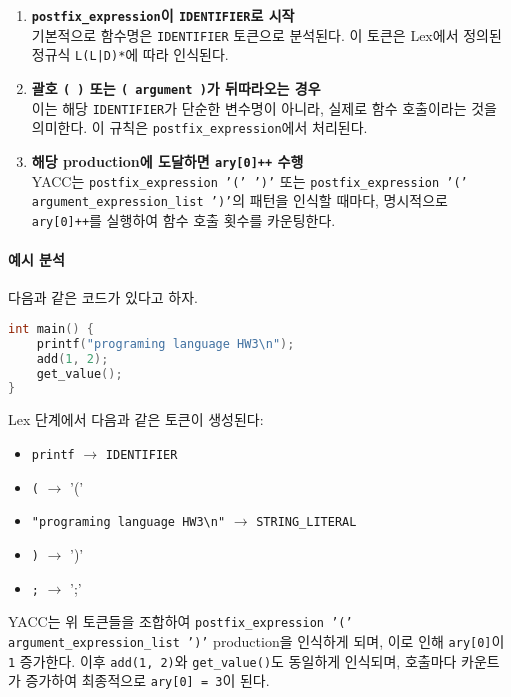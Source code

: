 \documentclass{article}
\begin{document}
\begin{enumerate}
  \item \textbf{\texttt{postfix\_expression}이 \texttt{IDENTIFIER}로 시작} \\
  기본적으로 함수명은 \texttt{IDENTIFIER} 토큰으로 분석된다. 이 토큰은 Lex에서 정의된 정규식 \texttt{{L}({L}|{D})*}에 따라 인식된다.

  \item \textbf{괄호 \texttt{( )} 또는 \texttt{( argument )}가 뒤따라오는 경우} \\
  이는 해당 \texttt{IDENTIFIER}가 단순한 변수명이 아니라, 실제로 함수 호출이라는 것을 의미한다. 이 규칙은 \texttt{postfix\_expression}에서 처리된다.

  \item \textbf{해당 production에 도달하면 \texttt{ary[0]++} 수행} \\
  YACC는 \texttt{postfix\_expression '(' ')'} 또는 \texttt{postfix\_expression '(' argument\_expression\_list ')'}의 패턴을 인식할 때마다, 명시적으로 \texttt{ary[0]++}를 실행하여 함수 호출 횟수를 카운팅한다.
\end{enumerate}


\paragraph{예시 분석}
다음과 같은 코드가 있다고 하자.

\begin{lstlisting}[language=C]
int main() {
    printf("programing language HW3\n");
    add(1, 2);
    get_value();
}
\end{lstlisting}

Lex 단계에서 다음과 같은 토큰이 생성된다:

\begin{itemize}
  \item \texttt{printf} $\rightarrow$ \texttt{IDENTIFIER}
  \item \texttt{(} $\rightarrow$ '('
  \item \texttt{"programing language HW3\textbackslash n"} $\rightarrow$ \texttt{STRING\_LITERAL}
  \item \texttt{)} $\rightarrow$ ')'
  \item \texttt{;} $\rightarrow$ ';'
\end{itemize}

YACC는 위 토큰들을 조합하여 \texttt{postfix\_expression '(' argument\_expression\_list ')'} production을 인식하게 되며, 이로 인해 \texttt{ary[0]}이 \texttt{1} 증가한다. 이후 \texttt{add(1, 2)}와 \texttt{get\_value()}도 동일하게 인식되며, 호출마다 카운트가 증가하여 최종적으로 \texttt{ary[0] = 3}이 된다.
\end{document}
